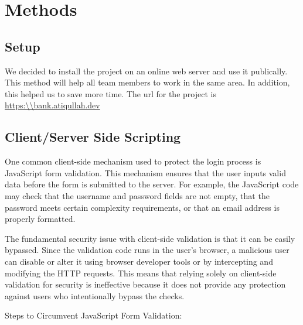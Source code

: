 \chapter{Methods}\label{chap:methods}

\section{Setup}
We decided to install the project on an online web server and use it publically. 
This method will help all team members to work in the same area. 
In addition, this helped us to save more time.
The url for the project is \url{https:\\bank.atiqullah.dev}

\section{Client/Server Side Scripting }

One common client-side mechanism used to protect the login process is JavaScript form validation. 
This mechanism ensures that the user inputs valid data before the form is submitted to the server. 
For example, the JavaScript code may check that the username and password fields are not empty, 
that the password meets certain complexity requirements, or that an email address is properly formatted.

The fundamental security issue with client-side validation is that it can be easily bypassed. 
Since the validation code runs in the user's browser, a malicious user can disable or alter it using browser developer tools or by intercepting and modifying the HTTP requests. 
This means that relying solely on client-side validation for security is ineffective because it does not provide any protection against users who intentionally bypass the checks.

Steps to Circumvent JavaScript Form Validation:

